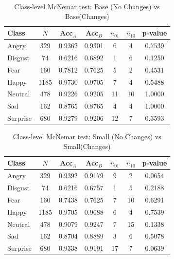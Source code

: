 \begin{table}[H]
\centering
\caption{Class-level McNemar test: Base (No Changes) vs Base(Changes)}
\label{tab:mcnemar_class_pairs_base}
\begin{tabular}{lcccccc}
\hline
Class & $N$ & Acc$_A$ & Acc$_B$ & $n_{01}$ & $n_{10}$ & p-value \\
\hline
Angry    & 329  & 0.9362 & 0.9301 & 6  & 4  & 0.7539 \\
Disgust  & 74   & 0.6216 & 0.6892 & 1  & 6  & 0.1250 \\
Fear     & 160  & 0.7812 & 0.7625 & 5  & 2  & 0.4531 \\
Happy    & 1185 & 0.9730 & 0.9705 & 7  & 4  & 0.5488 \\
Neutral  & 478  & 0.9226 & 0.9205 & 11 & 10 & 1.0000 \\
Sad      & 162  & 0.8765 & 0.8765 & 4  & 4  & 1.0000 \\
Surprise & 680  & 0.9279 & 0.9206 & 12 & 7  & 0.3593 \\
\bottomrule
\end{tabular}
\end{table}

\begin{table}[H]
\centering
\caption{Class-level McNemar test: Small (No Changes) vs Small(Changes)}
\label{tab:mcnemar_class_pairs_small}
\begin{tabular}{lcccccc}
\hline
Class & $N$ & Acc$_A$ & Acc$_B$ & $n_{01}$ & $n_{10}$ & p-value \\
\hline
Angry    & 329  & 0.9392 & 0.9179 & 9  & 2  & 0.0654 \\
Disgust  & 74   & 0.6216 & 0.6757 & 1  & 5  & 0.2188 \\
Fear     & 160  & 0.7438 & 0.7625 & 7  & 10 & 0.6291 \\
Happy    & 1185 & 0.9705 & 0.9688 & 6  & 4  & 0.7539 \\
Neutral  & 478  & 0.9079 & 0.9247 & 7  & 15 & 0.1338 \\
Sad      & 162  & 0.8704 & 0.8889 & 3  & 6  & 0.5078 \\
Surprise & 680  & 0.9338 & 0.9191 & 17 & 7  & 0.0639 \\
\end{tabular}
\end{table}

